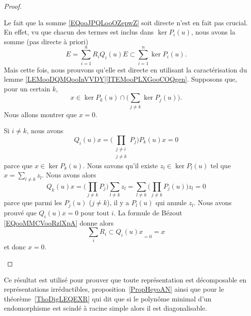 \begin{proof}
\begin{subproof}
		Le fait que la somme \eqref{EQooJPQLooOZepwZ} soit directe n'est en fait pas crucial. En effet, vu que chacun des termes est inclus dans \( \ker P_i(u)\), nous avons la somme (pas directe à priori)
		\begin{equation}
			E=\sum_{i=1}^nR_iQ_i(u)E\subset\sum_{i=1}^n\ker P_i(u).
		\end{equation}
		Mais cette fois, nous prouvons qu'elle est directe en utilisant la caractérisation du lemme \ref{LEMooDQMQooInVVDY}\ref{ITEMooPLXGooCOQgen}. Supposons que, pour un certain \( k\),
		\begin{equation}
			x\in\ker P_k(u)\cap\big( \sum_{j\neq k}\ker P_j(u) \big).
		\end{equation}
		Nous allons montrer que \( x=0\).
		\begin{subproof}
			\spitem[\( Q_i(u)x=0\) si \( i\neq k\)]
			Si \( i\neq k\), nous avons
			\begin{equation}
				Q_i(u)x=\Big( \prod_{\substack{j\neq i\\j\neq k}}P_j \Big)P_k(u)x=0
			\end{equation}
			parce que \( x\in\ker P_k(u)\).
			\spitem[\( Q_k(u)x=0\)]
			Nous savons qu'il existe \( z_l\in\ker P_l(u)\) tel que \( x=\sum_{l\neq k}z_l\). Nous avons alors
			\begin{equation}
				Q_k(u)x=\Big( \prod_{j\neq k}P_j \Big)\sum_{l\neq k}z_l=\sum_{l\neq k}\Big( \prod_{j\neq k}P_j(u) \Big)z_l=0
			\end{equation}
			parce que parmi les \( P_j(u)\) (\( j\neq k\)), il y a \( P_l(u)\) qui annule \( z_l\).
			\spitem[Et finalement]
			Nous avons prouvé que \( Q_i(u)x=0\) pour tout \( i\). La formule de Bézout \eqref{EQooMMCVooRzlXpA} donne alors
			\begin{equation}
				\sum_iR_i\subset{Q_i(u)x}_{=0}=x
			\end{equation}
			et donc \( x=0\).
		\end{subproof}
	\end{subproof}
\end{proof}

\begin{normaltext}
	Ce résultat est utilisé pour prouver que toute représentation est décomposable en représentations irréductibles, proposition~\ref{PropHeyoAN} ainsi que pour le théorème~\ref{ThoDigLEQEXR} qui dit que si le polynôme minimal d'un endomorphisme est scindé à racine simple alors il est diagonalisable.
\end{normaltext}

